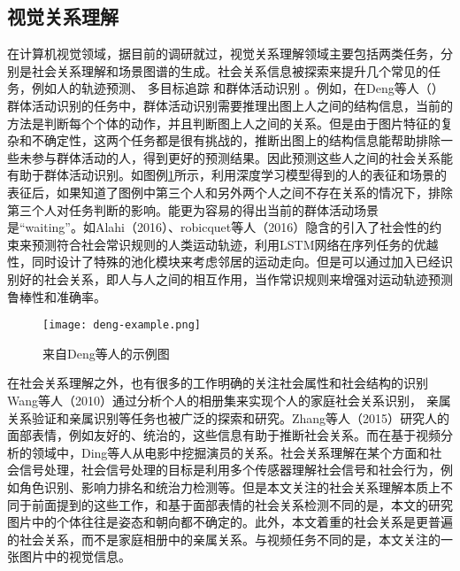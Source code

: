 \subsection{视觉关系理解}
在计算机视觉领域，据目前的调研就过，视觉关系理解领域主要包括两类任务，分别是社会关系理解和场景图谱的生成。社会关系信息被探索来提升几个常见的任务，例如人的轨迹预测\cite{kim2015brvo,robicquet2016learning}、 多目标追踪\cite{chen2012discovering,qin2012improving} 和群体活动识别
\cite{direkoglu2012team,lan2012social,lan2012discriminative}。例如，在Deng等人（\cite{deng2016structure}）群体活动识别的任务中，群体活动识别需要推理出图上人之间的结构信息，当前的方法是判断每个个体的动作，并且判断图上人之间的关系。但是由于图片特征的复杂和不确定性，这两个任务都是很有挑战的，推断出图上的结构信息能帮助排除一些未参与群体活动的人，得到更好的预测结果。因此预测这些人之间的社会关系能有助于群体活动识别。如图例\ref{fig:deng-example}所示，利用深度学习模型得到的人的表征和场景的表征后，如果知道了图例中第三个人和另外两个人之间不存在关系的情况下，排除第三个人对任务判断的影响。能更为容易的得出当前的群体活动场景是``waiting''。如Alahi（2016）\cite{alahi2016social}、robicquet等人（2016）\cite{robicquet2016learning}隐含的引入了社会性的约束来预测符合社会常识规则的人类运动轨迹，利用LSTM网络在序列任务的优越性，同时设计了特殊的池化模块来考虑邻居的运动走向。但是可以通过加入已经识别好的社会关系，即人与人之间的相互作用，当作常识规则来增强对运动轨迹预测鲁棒性和准确率。
\begin{figure}[htpb]
	\centering
	\texttt{[image: deng-example.png]}
    \caption{来自Deng等人\cite{deng2016structure}的示例图}
	\vspace*{-3.5mm}
	\label{fig:deng-example}
\end{figure}

在社会关系理解之外，也有很多的工作明确的关注社会属性和社会结构的识别Wang等人（2010）\cite{wang2010seeing}通过分析个人的相册集来实现个人的家庭社会关系识别，
亲属关系验证\cite{dibeklioglu2013like,fang2010towards,xia2012understanding}和亲属识别\cite{chen2012discovering,guo2014graph}等任务也被广泛的探索和研究。Zhang等人（2015）\cite{zhang2015learning}研究人的面部表情，例如友好的、统治的，这些信息有助于推断社会关系。而在基于视频分析的领域中，Ding等人\cite{ding2014learning}从电影中挖掘演员的关系。社会关系理解在某个方面和社会信号处理\cite{vinciarelli2009social}，社会信号处理的目标是利用多个传感器理解社会信号和社会行为，例如角色识别、影响力排名和统治力检测等\cite{hung2007using,rienks2006detection,salamin2009automatic}。但是本文关注的社会关系理解本质上不同于前面提到的这些工作，和基于面部表情的社会关系检测不同的是，本文的研究图片中的个体往往是姿态和朝向都不确定的。此外，本文着重的社会关系是更普遍的社会关系，而不是家庭相册中的亲属关系。与视频任务不同的是，本文关注的一张图片中的视觉信息。

